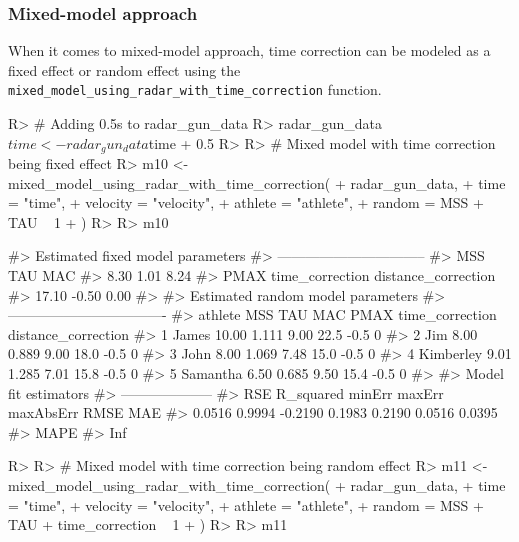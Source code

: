 \documentclass[
]{jss}
\begin{document}
\hypertarget{mixed-model-approach}{%
\subsubsection{Mixed-model approach}\label{mixed-model-approach}}

When it comes to mixed-model approach, time correction can be modeled as a fixed effect or random effect using the \texttt{mixed\_model\_using\_radar\_with\_time\_correction} function.

\begin{CodeChunk}
\begin{CodeInput}
R> # Adding 0.5s to radar_gun_data
R> radar_gun_data$time <- radar_gun_data$time + 0.5
R> 
R> # Mixed model with time correction being fixed effect
R> m10 <- mixed_model_using_radar_with_time_correction(
+   radar_gun_data,
+   time = "time",
+   velocity = "velocity",
+   athlete = "athlete",
+   random = MSS + TAU ~ 1
+ )
R> 
R> m10
\end{CodeInput}
\begin{CodeOutput}
#> Estimated fixed model parameters
#> --------------------------------
#>                 MSS                 TAU                 MAC 
#>                8.30                1.01                8.24 
#>                PMAX     time_correction distance_correction 
#>               17.10               -0.50                0.00 
#> 
#> Estimated random model parameters
#> ----------------------------------
#>     athlete   MSS   TAU  MAC PMAX time_correction distance_correction
#> 1     James 10.00 1.111 9.00 22.5            -0.5                   0
#> 2       Jim  8.00 0.889 9.00 18.0            -0.5                   0
#> 3      John  8.00 1.069 7.48 15.0            -0.5                   0
#> 4 Kimberley  9.01 1.285 7.01 15.8            -0.5                   0
#> 5  Samantha  6.50 0.685 9.50 15.4            -0.5                   0
#> 
#> Model fit estimators
#> --------------------
#>       RSE R_squared    minErr    maxErr maxAbsErr      RMSE       MAE 
#>    0.0516    0.9994   -0.2190    0.1983    0.2190    0.0516    0.0395 
#>      MAPE 
#>       Inf
\end{CodeOutput}
\begin{CodeInput}
R> 
R> # Mixed model with time correction being random effect
R> m11 <- mixed_model_using_radar_with_time_correction(
+   radar_gun_data,
+   time = "time",
+   velocity = "velocity",
+   athlete = "athlete",
+   random = MSS + TAU + time_correction ~ 1
+ )
R> 
R> m11
\end{CodeInput}

\end{CodeChunk}
\end{document}

